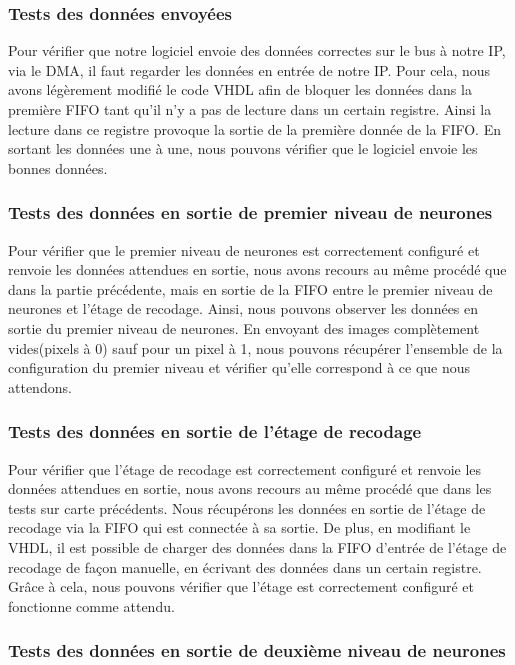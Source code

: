 \subsubsection{Tests des données envoyées}

Pour vérifier que notre logiciel envoie des données correctes sur le bus à notre
IP, via le DMA, il faut regarder les données en entrée de notre IP.
Pour cela, nous avons légèrement modifié le code VHDL afin de bloquer les
données dans la première FIFO tant qu'il n'y a pas de lecture dans
un certain registre. Ainsi la lecture dans ce registre provoque la sortie de
la première donnée de la FIFO. En sortant les données une à une, nous pouvons
vérifier que le logiciel envoie les bonnes données.

\subsubsection{Tests des données en sortie de premier niveau de neurones}

Pour vérifier que le premier niveau de neurones est correctement configuré et
renvoie les données attendues en sortie, nous avons recours au même procédé que
dans la partie précédente, mais en sortie de la FIFO entre le premier niveau
de neurones et l'étage de recodage.
Ainsi, nous pouvons observer les données en sortie du premier niveau de neurones.
En envoyant des images complètement vides(pixels à 0) sauf pour un pixel à 1,
nous pouvons récupérer l'ensemble de la configuration du premier niveau et
vérifier qu'elle correspond à ce que nous attendons.

\subsubsection{Tests des données en sortie de l'étage de recodage}

Pour vérifier que l'étage de recodage est correctement configuré et renvoie les
données attendues en sortie, nous avons recours au même procédé que dans les
tests sur carte précédents. Nous récupérons les données en sortie de l'étage
de recodage via la FIFO qui est connectée à sa sortie.
De plus, en modifiant le VHDL, il est possible de charger des données dans la
FIFO d'entrée de l'étage de recodage de façon manuelle, en écrivant des données
dans un certain registre. Grâce à cela, nous pouvons vérifier que l'étage
est correctement configuré et fonctionne comme attendu.

\subsubsection{Tests des données en sortie de deuxième niveau de neurones}

